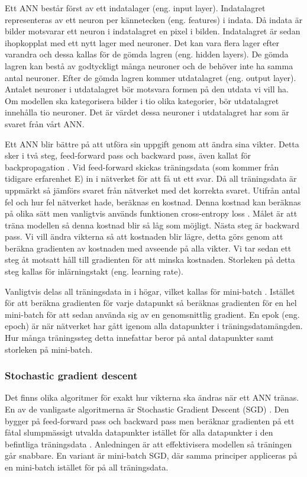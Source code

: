 \documentclass[]{kththesis}
\begin{document}
Ett ANN består först av ett indatalager (eng. input layer). Indatalagret representeras av ett neuron per kännetecken (eng. features) i indata. Då indata är bilder motsvarar ett neuron i indatalagret en pixel i bilden. Indatalagret är sedan ihopkopplat med ett nytt lager med neuroner. Det kan vara flera lager efter varandra och dessa kallas för de gömda lagren (eng. hidden layers). De gömda lagren kan bestå av godtyckligt många neuroner och de behöver inte ha samma antal neuroner. Efter de gömda lagren kommer utdatalagret (eng. output layer). Antalet neuroner i utdatalagret bör motsvara formen på den utdata vi vill ha. Om modellen ska kategorisera bilder i tio olika kategorier, bör utdatalagret innehålla tio neuroner. Det är värdet dessa neuroner i utdatalagret har som är svaret från vårt ANN.

Ett ANN blir bättre på att utföra sin uppgift genom att ändra sina vikter. Detta sker i två steg, feed-forward pass och backward pass, även kallat för backpropagation \parencite{alpaydin2009introduction}. Vid feed-forward skickas träningsdata (som kommer från tidigare erfarenhet E) in i nätverket för att få ut ett svar. Då all träningsdata är uppmärkt så jämförs svaret från nätverket med det korrekta svaret. Utifrån antal fel och hur fel nätverket hade, beräknas en kostnad. Denna kostnad kan beräknas på olika sätt men vanligtvis används funktionen cross-entropy loss \parencite{Goodfellow-et-al-2016}. Målet är att träna modellen så denna kostnad blir så låg som möjligt. Nästa steg är backward pass. Vi vill ändra vikterna så att kostnaden blir lägre, detta görs genom att beräkna gradienten av kostnaden med avseende på alla vikter. Vi tar sedan ett steg åt motsatt håll till gradienten för att minska kostnaden. Storleken på detta steg kallas för inlärningstakt (eng. learning rate).

Vanligtvis delas all träningsdata in i högar, vilket kallas för mini-batch \parencite{Goodfellow-et-al-2016}. Istället för att beräkna gradienten för varje datapunkt så beräknas gradienten för en hel mini-batch för att sedan använda sig av en genomsnittlig gradient. En epok (eng. epoch) är när nätverket har gått igenom alla datapunkter i träningsdatamängden. Hur många träningssteg detta innefattar beror på antal datapunkter samt storleken på mini-batch.

\subsubsection{Stochastic gradient descent}
Det finns olika algoritmer för exakt hur vikterna ska ändras när ett ANN tränas. En av de vanligaste algoritmerna är Stochastic Gradient Descent (SGD) \parencite{Goodfellow-et-al-2016}. Den bygger på feed-forward pass och backward pass men beräknar gradienten på ett fåtal slumpmässigt utvalda datapunkter istället för alla datapunkter i den befintliga träningsdata \parencite{bottou2010large}. Anledningen är att effektivisera modellen så träningen går snabbare. En variant är mini-batch SGD, där samma principer appliceras på en mini-batch istället för på all träningsdata.
\end{document}
